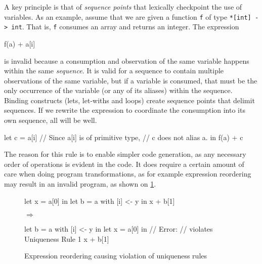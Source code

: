\documentclass[oneside]{memoir}
\newcommand{\emp}[1]{\textcolor{DikuRed}{ #1}}
\begin{document}
A key principle is that of \textit{sequence points} that lexically
checkpoint the use of variables.  As an example, assume that we are
given a function \texttt{f} of type \texttt{*[int]~->~int}.  That is,
\texttt{f} consumes an array and returns an integer.  The expression
\begin{colorcode}
  f(a) + a[i]
\end{colorcode}
is invalid because a consumption and observation of the same variable
happens within the same \textit{sequence}.  It is valid for a sequence
to contain multiple observations of the same variable, but if a
variable is consumed, that must be the only occurrence of the variable
(or any of its aliases) within the sequence.  Binding constructs
(lets, let-withs and loops) create sequence points that delimit
sequences.  If we rewrite the expression to coordinate the consumption
into its own sequence, all will be well.
\begin{colorcode}
  let c = a[i] // Since a[i] is of primitive type,
               // c does not alias a.
  in f(a) + c
\end{colorcode}

The reason for this rule is to enable simpler code generation, as any
necessary order of operations is evident in the code.  It does require
a certain amount of care when doing program transformations, as for
example expression reordering may result in an invalid program, as
shown on \cref{fig:reordering-uniqueness-violation}.

\begin{figure}
\centering
\begin{minipage}{0.25\columnwidth}
\begin{colorcode}
let x = a[0] in
let b = a with
  [i] <- y in
x + b[1]
\end{colorcode}
\end{minipage}
\begin{minipage}{0.05\columnwidth}
$\Rightarrow$
\end{minipage}
\begin{minipage}{0.6\columnwidth}
\begin{colorcode}
let b = a with [i] <- y in
let x = a[0] in // \emp{Error}:
                // violates Uniqueness Rule 1
x + b[1]
\end{colorcode}
\end{minipage}
\caption{Expression reordering causing violation of uniqueness rules}
\label{fig:reordering-uniqueness-violation}
\end{figure}
\end{document}

